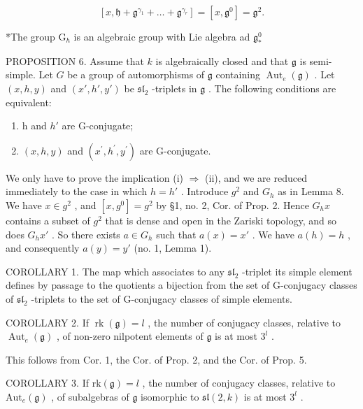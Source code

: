 \[
[ x, \mathfrak {h} + \mathfrak {g} ^ {\gamma_ {1}} + \dots + \mathfrak {g} ^ {\gamma_ {r}} ] = [ x, \mathfrak {g} ^ {0} ] = \mathfrak {g} ^ {2}.\tag{Q.E.D.}
\]

*The group \(\mathrm{G}_h\) is an algebraic group with Lie algebra ad \(\mathfrak{g}^0_*\)

PROPOSITION 6. Assume that \(k\) is algebraically closed and that \(\mathfrak{g}\) is semi-simple. Let \(G\) be a group of automorphisms of \(\mathfrak{g}\) containing \(\operatorname{Aut}_e(\mathfrak{g})\) . Let \((x, h, y)\) and \((x', h', y')\) be \(\mathfrak{sl}_2\) -triplets in \(\mathfrak{g}\) . The following conditions are equivalent:

\begin{enumerate}
\def\labelenumi{(\roman{enumi})}
\item
  h and \(h'\) are G-conjugate;
\item
  \((x,h,y)\) and \((x^{\prime},h^{\prime},y^{\prime})\) are G-conjugate.
\end{enumerate}

We only have to prove the implication (i) \(\Longrightarrow\) (ii), and we are reduced immediately to the case in which \(h = h'\) . Introduce \(g^{2}\) and \(G_{h}\) as in Lemma 8. We have \(x \in g^{2}\) , and \([x, g^{0}] = g^{2}\) by §1, no. 2, Cor. of Prop. 2. Hence \(G_{h}x\) contains a subset of \(g^{2}\) that is dense and open in the Zariski topology, and so does \(G_{h}x'\) . So there exists \(a \in G_{h}\) such that \(a(x) = x'\) . We have \(a(h) = h\) , and consequently \(a(y) = y'\) (no. 1, Lemma 1).

COROLLARY 1. The map which associates to any \(\mathfrak{sl}_2\) -triplet its simple element defines by passage to the quotients a bijection from the set of G-conjugacy classes of \(\mathfrak{sl}_2\) -triplets to the set of G-conjugacy classes of simple elements.

COROLLARY 2. If \(\operatorname{rk}(\mathfrak{g}) = l\) , the number of conjugacy classes, relative to \(\operatorname{Aut}_e(\mathfrak{g})\) , of non-zero nilpotent elements of \(\mathfrak{g}\) is at most \(3^l\) .

This follows from Cor. 1, the Cor. of Prop. 2, and the Cor. of Prop. 5.

COROLLARY 3. If \(\mathrm{rk}(\mathfrak{g}) = l\) , the number of conjugacy classes, relative to \(\mathrm{Aut}_e(\mathfrak{g})\) , of subalgebras of \(\mathfrak{g}\) isomorphic to \(\mathfrak{sl}(2,k)\) is at most \(3^l\) .


